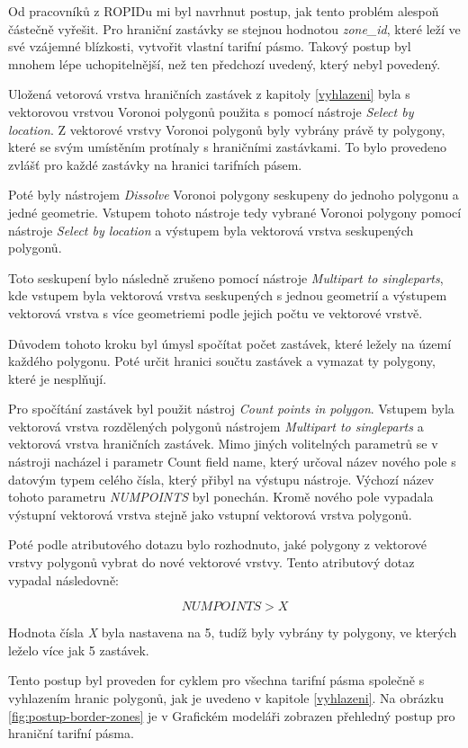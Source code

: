 Od pracovníků z ROPIDu mi byl navrhnut postup, jak tento problém alespoň částečně vyřešit. Pro hraniční zastávky se stejnou hodnotou \textit{zone\_id}, 
které leží ve své vzájemné blízkosti, vytvořit vlastní tarifní pásmo. Takový postup byl mnohem lépe uchopitelnější, než ten předchozí uvedený, který nebyl povedený.

Uložená vetorová vrstva hraničních zastávek z kapitoly \ref{vyhlazeni} byla s vektorovou vrstvou Voronoi polygonů
použita s pomocí nástroje \textit{Select by location}. Z vektorové vrstvy Voronoi polygonů byly vybrány právě ty polygony,
které se svým umístěním protínaly s hraničními zastávkami. To bylo provedeno zvlášť pro každé zastávky na hranici tarifních pásem.

Poté byly nástrojem \textit{Dissolve} Voronoi polygony seskupeny do jednoho polygonu a jedné geometrie. Vstupem tohoto nástroje
tedy vybrané Voronoi polygony pomocí nástroje \textit{Select by location} a výstupem byla vektorová vrstva seskupených polygonů.

Toto seskupení bylo následně zrušeno pomocí nástroje \textit{Multipart to singleparts}, kde vstupem byla vektorová vrstva 
seskupených s jednou geometrií a výstupem vektorová vrstva s více geometriemi podle jejich počtu ve vektorové vrstvě.

Důvodem tohoto kroku byl úmysl spočítat počet zastávek, které ležely na území každého polygonu. Poté určit hranici
součtu zastávek a vymazat ty polygony, které je nesplňují.

Pro spočítání zastávek byl použit nástroj \textit{Count points in polygon}. Vstupem byla vektorová vrstva rozdělených polygonů nástrojem \textit{Multipart to singleparts}
a vektorová vrstva hraničních zastávek. Mimo jiných volitelných parametrů se v nástroji nacházel i parametr Count field name, který určoval název nového pole
s datovým typem celého čísla,
který přibyl na výstupu nástroje. Výchozí název tohoto parametru \textit{NUMPOINTS} byl ponechán. Kromě nového pole vypadala výstupní vektorová vrstva stejně
jako vstupní vektorová vrstva polygonů.

Poté podle atributového dotazu bylo rozhodnuto, jaké polygony z vektorové vrstvy polygonů vybrat do nové vektorové vrstvy.
Tento atributový dotaz vypadal následovně: 

\[NUMPOINTS > X\]

Hodnota čísla \textit{X} byla nastavena na 5, tudíž byly vybrány ty polygony, ve kterých leželo více jak 5 zastávek.

Tento postup byl proveden for cyklem pro všechna tarifní pásma společně s vyhlazením hranic polygonů,
jak je uvedeno v kapitole \ref{vyhlazeni}. Na obrázku \ref{fig:postup-border-zones} je v Grafickém modeláři zobrazen
přehledný postup pro hraniční tarifní pásma. 


